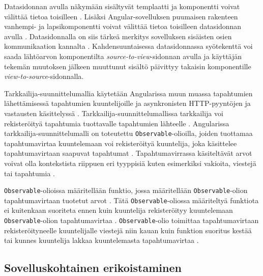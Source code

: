 \documentclass[finnish]{tktltiki2}
\theoremstyle{definition}
\theoremstyle{remark}
\numberwithin{figure}{section}
\begin{document}
Datasidonnan avulla näkymään sisältyvät templaatti ja komponentti voivat välittää tietoa toisilleen \cite{ArchitectureComponents}. Lisäksi Angular-sovelluksen puumaisen rakenteen vanhempi- ja lapsikomponentti voivat välittää tietoa toisilleen datasidonnan avulla \cite{ArchitectureComponents}. Datasidonnalla on siis tärkeä merkitys sovelluksen sisäisten osien kommunikaation kannalta \cite{ArchitectureComponents}. Kahdensuuntaisessa datasidonnassa syötekenttä voi saada lähtöarvon komponentilta \textit{source-to-view}-sidonnan avulla ja käyttäjän tekemän muutoksen jälkeen muuttunut sisältö päivittyy takaisin komponentille \textit{view-to-source}-sidonnalla. 

Tarkkailija-suunnittelumallia käytetään Angularissa muun muassa tapahtumien lähettämisessä tapahtumien kuuntelijoille ja asynkronisten HTTP-pyyntöjen ja vastausten käsittelyssä \cite{ObservablesInAngular}. Tarkkailija-suunnittelumallissa tarkkailija voi rekisteröityä tapahtumia tuottavalle tapahtumien lähteelle \cite{Ohjelmistoarkkitehtuurit}. Angularissa tarkkailija-suunnittelumalli on toteutettu \texttt{Observable}-olioilla, joiden tuottamaa tapahtumavirtaa kuuntelemaan voi rekisteröityä kuuntelija, joka käsittelee tapahtumavirtaan saapuvat tapahtumat \cite{Observables}. Tapahtumavirrassa käsiteltävät arvot voivat olla kontekstista riippuen eri tyyppisiä kuten esimerkiksi vakioita, viestejä tai tapahtumia \cite{Observables}.

\texttt{Observable}-olioissa määritellään funktio, jossa määritellään \texttt{Observable}-olion tapahtumavirtaan tuotetut arvot \cite{Observables}. Tätä \texttt{Observable}-oliossa määriteltyä funktiota ei kuitenkaan suoriteta ennen kuin kuuntelija rekisteröityy kuuntelemaan \texttt{Observable}-olion tapahtumavirtaa \cite{Observables}. \texttt{Observable}-olio toimittaa tapahtumavirtaan rekisteröityneelle kuuntelijalle viestejä niin kauan kuin funktion suoritus kestää tai kunnes kuuntelija lakkaa kuuntelemasta tapahtumavirtaa \cite{Observables}. 


\subsection{Sovelluskohtainen erikoistaminen}
\end{document}
